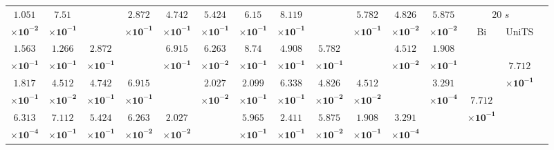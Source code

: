 \begin{table}[!ht]
{\begin{tabular}{|c|c|c|c|c|c|c|c|c|c|c|c|c|c|c|c|}
			$\mathbf{1.051}$ & $\mathbf{7.51}$ & \multirow{2}{*}{} & $\mathbf{2.872}$ & $\mathbf{4.742}$ & $\mathbf{5.424}$ & $\mathbf{6.15}$ & $\mathbf{8.119}$ & \multirow{2}{*}{} & $\mathbf{5.782}$ & $\mathbf{4.826}$ & $\mathbf{5.875}$ & \multicolumn{2}{c}{$20$ $s$} & \multicolumn{2}{c}{} \\ \cline{13-14}
			$\mathbf{\times 10^{-2}}$ & $\mathbf{\times 10^{-1}}$ & & $\mathbf{\times 10^{-1}}$ & $\mathbf{\times 10^{-1}}$ & $\mathbf{\times 10^{-1}}$ & $\mathbf{\times 10^{-1}}$ & $\mathbf{\times 10^{-1}}$ & & $\mathbf{\times 10^{-1}}$ & $\mathbf{\times 10^{-2}}$ & $\mathbf{\times 10^{-2}}$ & \multirow{2}{*}{Bi} & \multirow{2}{*}{UniTS} & \multicolumn{2}{c}{} \\ \cline{1-12}
			$\mathbf{1.563}$ & $\mathbf{1.266}$ & $\mathbf{2.872}$ & \multirow{2}{*}{} & $\mathbf{6.915}$ & $\mathbf{6.263}$ & $\mathbf{8.74}$ & $\mathbf{4.908}$ & $\mathbf{5.782}$ & \multirow{2}{*}{} & $\mathbf{4.512}$ & $\mathbf{1.908}$ & & & \multicolumn{2}{c}{} \\ \cline{13-14}
			$\mathbf{\times 10^{-1}}$ & $\mathbf{\times 10^{-1}}$ & $\mathbf{\times 10^{-1}}$ & & $\mathbf{\times 10^{-1}}$ & $\mathbf{\times 10^{-2}}$ & $\mathbf{\times 10^{-1}}$ & $\mathbf{\times 10^{-1}}$ & $\mathbf{\times 10^{-1}}$ & & $\mathbf{\times 10^{-2}}$ & $\mathbf{\times 10^{-1}}$ & \multirow{2}{*}{} & $\mathbf{7.712}$ & \multicolumn{2}{c}{} \\ \cline{1-12}
			$\mathbf{1.817}$ & $\mathbf{4.512}$ & $\mathbf{4.742}$ & $\mathbf{6.915}$ & \multirow{2}{*}{} & $\mathbf{2.027}$ & $\mathbf{2.099}$ & $\mathbf{6.338}$ & $\mathbf{4.826}$ & $\mathbf{4.512}$ & \multirow{2}{*}{} & $\mathbf{3.291}$ & & $\mathbf{\times 10^{-1}}$ & \multicolumn{2}{c}{} \\ \cline{13-14}
			$\mathbf{\times 10^{-1}}$ & $\mathbf{\times 10^{-2}}$ & $\mathbf{\times 10^{-1}}$ & $\mathbf{\times 10^{-1}}$ & & $\mathbf{\times 10^{-2}}$ & $\mathbf{\times 10^{-1}}$ & $\mathbf{\times 10^{-1}}$ & $\mathbf{\times 10^{-2}}$ & $\mathbf{\times 10^{-2}}$ & & $\mathbf{\times 10^{-4}}$ & $\mathbf{7.712}$ & \multirow{2}{*}{} & \multicolumn{2}{c}{} \\ \cline{1-12}
			$\mathbf{6.313}$ & $\mathbf{7.112}$ & $\mathbf{5.424}$ & $\mathbf{6.263}$ & $\mathbf{2.027}$ & \multirow{2}{*}{} & $\mathbf{5.965}$ & $\mathbf{2.411}$ & $\mathbf{5.875}$ & $\mathbf{1.908}$ & $\mathbf{3.291}$ & \multirow{2}{*}{} & $\mathbf{\times 10^{-1}}$ & & \multicolumn{2}{c}{} \\ \cline{13-14}
			$\mathbf{\times 10^{-4}}$ & $\mathbf{\times 10^{-1}}$ & $\mathbf{\times 10^{-1}}$ & $\mathbf{\times 10^{-2}}$ & $\mathbf{\times 10^{-2}}$ & & $\mathbf{\times 10^{-1}}$ & $\mathbf{\times 10^{-1}}$ & $\mathbf{\times 10^{-2}}$ & $\mathbf{\times 10^{-1}}$ & $\mathbf{\times 10^{-4}}$ & & \multicolumn{4}{c}{} \\ \cline{1-16}

\end{tabular}}
\end{table}
